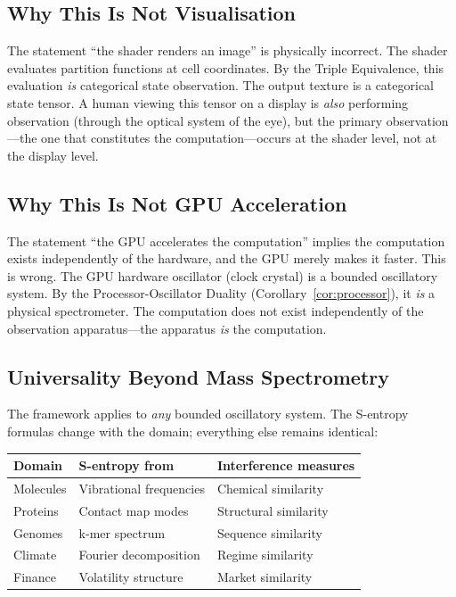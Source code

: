 \documentclass[11pt,twocolumn,a4paper]{article}
\theoremstyle{definition}
\theoremstyle{remark}
\begin{document}
\subsection{Why This Is Not Visualisation}

The statement ``the shader renders an image'' is physically incorrect. The shader evaluates partition functions at cell coordinates. By the Triple Equivalence, this evaluation \emph{is} categorical state observation. The output texture is a categorical state tensor. A human viewing this tensor on a display is \emph{also} performing observation (through the optical system of the eye), but the primary observation---the one that constitutes the computation---occurs at the shader level, not at the display level.

\subsection{Why This Is Not GPU Acceleration}

The statement ``the GPU accelerates the computation'' implies the computation exists independently of the hardware, and the GPU merely makes it faster. This is wrong. The GPU hardware oscillator (clock crystal) is a bounded oscillatory system. By the Processor-Oscillator Duality (Corollary~\ref{cor:processor}), it \emph{is} a physical spectrometer. The computation does not exist independently of the observation apparatus---the apparatus \emph{is} the computation.

\subsection{Universality Beyond Mass Spectrometry}

The framework applies to \emph{any} bounded oscillatory system. The S-entropy formulas change with the domain; everything else remains identical:

\begin{center}
\small
\begin{tabular}{lll}
\toprule
\textbf{Domain} & \textbf{S-entropy from} & \textbf{Interference measures} \\
\midrule
Molecules & Vibrational frequencies & Chemical similarity \\
Proteins & Contact map modes & Structural similarity \\
Genomes & k-mer spectrum & Sequence similarity \\
Climate & Fourier decomposition & Regime similarity \\
Finance & Volatility structure & Market similarity \\
\bottomrule
\end{tabular}
\end{center}
\end{document}
